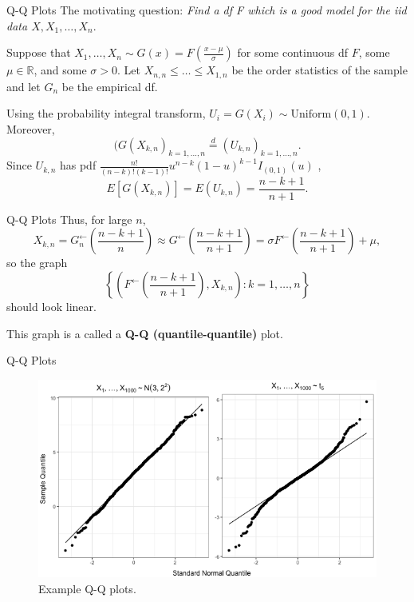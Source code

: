 \documentclass{beamer}
\begin{document}
\begin{frame}{Q-Q Plots}
    The motivating question: \textit{Find a df F which is a good model for the iid data $X, X_1, \ldots, X_n$}.

    \medskip

    Suppose that $X_1, \ldots, X_n \sim G(x) = F\left(\frac{x - \mu}{\sigma}\right)$ for some continuous df $F$, some $\mu \in \mathbb{R}$, and some $\sigma > 0$. Let $X_{n, n} \le \ldots \le X_{1, n}$ be the order statistics of the sample and let $G_n$ be the empirical df.

    \medskip

    Using the probability integral transform, $U_i = G(X_i) \sim \text{Uniform}(0, 1)$. Moreover,
    \[
    (G(X_{k, n})_{k = 1, \ldots, n} \overset{d}{=} (U_{k, n})_{k = 1, \ldots, n}.
    \]
    Since $U_{k, n}$ has pdf $\frac{n!}{(n - k)!(k - 1)!}u^{n - k}(1 - u)^{k - 1}I_{(0, 1)}(u)$ \cite{casella_and_berger_2002},
    \[
    E[G(X_{k, n})] = E(U_{k, n}) = \frac{n - k + 1}{n + 1}.
    \]
\end{frame}

\begin{frame}{Q-Q Plots}
    Thus, for large $n$,
    \[
    X_{k, n} = G_n^{\leftarrow}\left(\frac{n - k + 1}{n}\right) \approx G^{\leftarrow}\left(\frac{n - k + 1}{n + 1}\right) = \sigma F^{\leftarrow}\left(\frac{n - k + 1}{n + 1}\right) + \mu,
    \]
    so the graph
    \[
    \left\{\left(F^{\leftarrow}\left(\frac{n - k + 1}{n + 1}\right), X_{k, n}\right) : k = 1, \ldots, n\right\}
    \]
    should look linear.

    \smallskip

    This graph is a called a \textbf{Q-Q (quantile-quantile)} plot.
\end{frame}

\begin{frame}{Q-Q Plots}
    \begin{figure}
        \centering
        \includegraphics[scale=0.5]{qq_plots.png}
        \caption{Example Q-Q plots.}
        \label{fig:qq_plots}
    \end{figure}
\end{frame}
\end{document}

